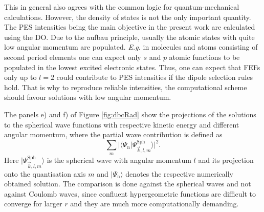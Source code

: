 This in general also agrees with the common logic for quantum-mechanical calculations.
However, the density of states is not the only important quantity. 
The PES intensities being the main objective in the present work are calculated using the DO.
Due to the aufbau principle, usually the atomic states with quite low angular momentum are populated.
\textit{E.g.} in molecules and atoms consisting of second period elements one can expect only $s$ and $p$ atomic functions to be populated in the lowest excited electronic states. 
Thus, one can expect that FEFs only up to $l=2$ could contribute to PES intensities if the dipole selection rules hold.
That is why to reproduce reliable intensities, the computational scheme should favour solutions with low angular momentum.

The panels e) and f) of Figure \ref{fig:dbcRad} show the projections of the solutions to the spherical wave functions with respective kinetic energy and different angular momentum, where the partial wave contribution is defined as
\begin{equation} \label{eq:PartWaveCoeff}
\sum_m|\langle \Psi_\text{n} | \Psi_{\vec{k},l,m}^\text{Sph}\rangle |^2.
\end{equation}
Here $|\Psi_{\vec{k},l,m}^\text{Sph}\rangle$ is the spherical wave  with angular momentum $l$ and its projection onto the quantisation axis $m$ and $|\Psi_\text{n}\rangle$ denotes the respective numerically obtained solution.
The comparison is done against the spherical waves and not against Coulomb waves, since confluent hypergeometric functions are difficult to converge for larger $r$ and they are much more computationally demanding.

